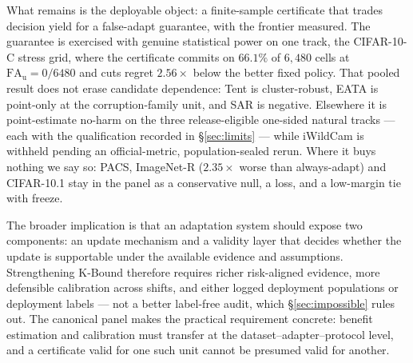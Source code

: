 What remains is the deployable object: a finite-sample certificate that trades decision yield for a
false-adapt guarantee, with the frontier measured. The guarantee is exercised with genuine
statistical power on one track, the CIFAR-10-C stress grid, where the certificate commits on
$66.1\%$ of $6{,}480$ cells at $\mathrm{FA}_{\mathrm u}=0/6480$ and cuts regret $2.56\times$ below
the better fixed policy. That pooled result does not erase candidate dependence: Tent is
cluster-robust, EATA is point-only at the corruption-family unit, and SAR is negative. Elsewhere it
is point-estimate no-harm on the three release-eligible one-sided natural tracks --- each with the
qualification recorded in \S\ref{sec:limits} --- while iWildCam is withheld pending an
official-metric, population-sealed rerun. Where it buys nothing we say so: PACS,
ImageNet-R ($2.35\times$ worse than always-adapt) and CIFAR-10.1 stay in the panel as a
conservative null, a loss, and a low-margin tie with freeze.

The broader implication is that an adaptation system should expose two components: an update
mechanism and a validity layer that decides whether the update is supportable under the available
evidence and assumptions. Strengthening K-Bound therefore requires richer risk-aligned evidence,
more defensible calibration across shifts, and either logged deployment populations or deployment
labels --- not a better label-free audit, which \S\ref{sec:impossible} rules out. The canonical
panel makes the practical requirement concrete: benefit estimation and calibration must transfer at
the dataset--adapter--protocol level, and a certificate valid for one such unit cannot be presumed
valid for another.
